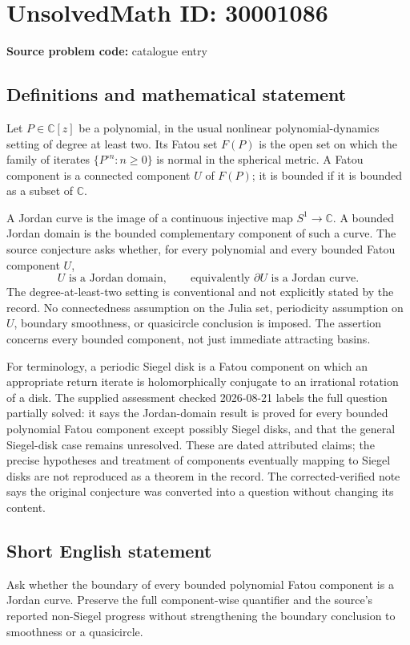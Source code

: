 \documentclass[11pt]{article}
\newcommand{\C}{\mathbb{C}}
\begin{document}
\section*{UnsolvedMath ID: 30001086}
\textbf{Source problem code:} catalogue entry
\subsection{Definitions and mathematical statement}
Let $P\in\C[z]$ be a polynomial, in the usual nonlinear polynomial-dynamics setting of degree at least two. Its Fatou set $F(P)$ is the open set on which the family of iterates $\{P^{\circ n}:n\geq0\}$ is normal in the spherical metric. A Fatou component is a connected component $U$ of $F(P)$; it is bounded if it is bounded as a subset of $\C$.

A Jordan curve is the image of a continuous injective map $S^1\to\C$. A bounded Jordan domain is the bounded complementary component of such a curve. The source conjecture asks whether, for every polynomial and every bounded Fatou component $U$,
\[
U\text{ is a Jordan domain},\qquad\text{equivalently }\partial U\text{ is a Jordan curve}.
\]
The degree-at-least-two setting is conventional and not explicitly stated by the record. No connectedness assumption on the Julia set, periodicity assumption on $U$, boundary smoothness, or quasicircle conclusion is imposed. The assertion concerns every bounded component, not just immediate attracting basins.

For terminology, a periodic Siegel disk is a Fatou component on which an appropriate return iterate is holomorphically conjugate to an irrational rotation of a disk. The supplied assessment checked 2026-08-21 labels the full question partially solved: it says the Jordan-domain result is proved for every bounded polynomial Fatou component except possibly Siegel disks, and that the general Siegel-disk case remains unresolved. These are dated attributed claims; the precise hypotheses and treatment of components eventually mapping to Siegel disks are not reproduced as a theorem in the record. The corrected-verified note says the original conjecture was converted into a question without changing its content.
\subsection{Short English statement}
Ask whether the boundary of every bounded polynomial Fatou component is a Jordan curve. Preserve the full component-wise quantifier and the source's reported non-Siegel progress without strengthening the boundary conclusion to smoothness or a quasicircle.
\end{document}
